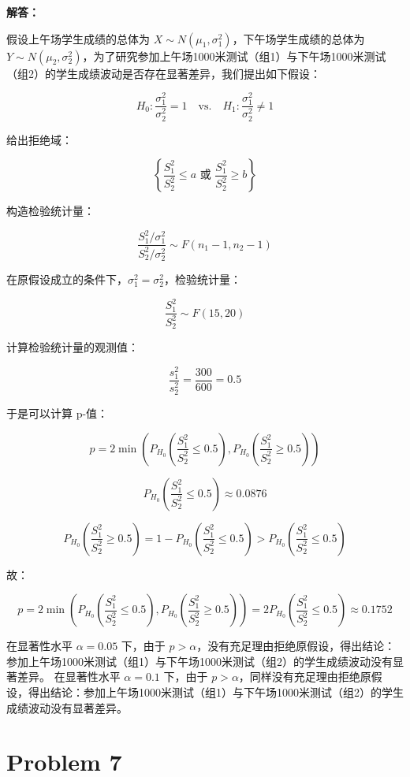 \documentclass[12pt,a4paper]{article}
\begin{document}
\begin{answerbox}
\textbf{解答：}

假设上午场学生成绩的总体为 $X \sim N\left(\mu_1, \sigma_1^2\right)$，下午场学生成绩的总体为 $Y \sim N\left(\mu_2, \sigma_2^2\right)$，为了研究参加上午场1000米测试（组1）与下午场1000米测试（组2）的学生成绩波动是否存在显著差异，我们提出如下假设：

$$
H_0: \frac{\sigma_1^2}{\sigma_2^2} = 1 \quad \text{vs.} \quad H_1: \frac{\sigma_1^2}{\sigma_2^2} \neq 1
$$

给出拒绝域：

$$
\left\{\frac{S_1^2}{S_2^2} \leq a \text{ 或 } \frac{S_1^2}{S_2^2} \geq b\right\}
$$

构造检验统计量：

$$
\frac{S_1^2/\sigma_1^2}{S_2^2/\sigma_2^2} \sim F(n_1-1, n_2-1)
$$

在原假设成立的条件下，$\sigma_1^2 = \sigma_2^2$，检验统计量：

$$
\frac{S_1^2}{S_2^2} \sim F(15, 20)
$$

计算检验统计量的观测值：

$$
\frac{s_1^2}{s_2^2} = \frac{300}{600} = 0.5
$$

于是可以计算 p-值：

$$
p = 2\min\left(P_{H_0}\left(\frac{S_1^2}{S_2^2} \leq 0.5\right), P_{H_0}\left(\frac{S_1^2}{S_2^2} \geq 0.5\right)\right)
$$

$$
P_{H_0}\left(\frac{S_1^2}{S_2^2} \leq 0.5\right) \approx 0.0876
$$

$$
P_{H_0}\left(\frac{S_1^2}{S_2^2} \geq 0.5\right) = 1 - P_{H_0}\left(\frac{S_1^2}{S_2^2} \leq 0.5\right) > P_{H_0}\left(\frac{S_1^2}{S_2^2} \leq 0.5\right)
$$

故：

$$
p = 2\min\left(P_{H_0}\left(\frac{S_1^2}{S_2^2} \leq 0.5\right), P_{H_0}\left(\frac{S_1^2}{S_2^2} \geq 0.5\right)\right) = 2P_{H_0}\left(\frac{S_1^2}{S_2^2} \leq 0.5\right) \approx 0.1752
$$


在显著性水平 $\alpha=0.05$ 下，由于 $p > \alpha$，没有充足理由拒绝原假设，得出结论：参加上午场1000米测试（组1）与下午场1000米测试（组2）的学生成绩波动没有显著差异。
在显著性水平 $\alpha=0.1$ 下，由于 $p > \alpha$，同样没有充足理由拒绝原假设，得出结论：参加上午场1000米测试（组1）与下午场1000米测试（组2）的学生成绩波动没有显著差异。

\end{answerbox}

\section{Problem 7}
\end{document}
